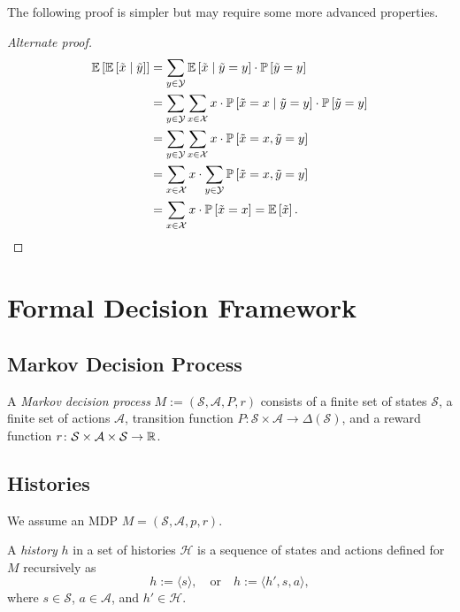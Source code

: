 The following proof is simpler but may require some more advanced properties.
\begin{proof}[Alternate proof]
\begin{align*}
\mathbb{E}\left[\mathbb{E}\left[\tilde{x} \mid  \tilde{y}\right] \right]
&= \sum_{y\in \mathcal{Y}} \mathbb{E}\left[\tilde{x} \mid \tilde{y} = y \right] \cdot \mathbb{P}\left[ \tilde{y} = y \right]  \\
&= \sum_{y\in \mathcal{Y}} \sum_{x\in \mathcal{X}} x \cdot \mathbb{P}\left[\tilde{x} = x \mid \tilde{y} = y \right] \cdot \mathbb{P}\left[ \tilde{y} = y \right]  \\
&= \sum_{y\in \mathcal{Y}} \sum_{x\in \mathcal{X}} x \cdot  \mathbb{P}\left[\tilde{x} = x, \tilde{y} = y \right]   \\
&=  \sum_{x\in \mathcal{X}} x \cdot \sum_{y\in \mathcal{Y}} \mathbb{P}\left[\tilde{x} = x, \tilde{y} = y \right]   \\
&=  \sum_{x\in \mathcal{X}} x \cdot  \mathbb{P}\left[\tilde{x} = x \right]  = \mathbb{E} \left[ \tilde{x} \right].
\end{align*}
\end{proof}

\section{Formal Decision Framework}

\subsection{Markov Decision Process}

\begin{definition} \label{def:MDP}
A \emph{Markov decision process} $M := (\mathcal{S}, \mathcal{A}, P, r)$ consists of a finite set of states $\mathcal{S}$, a finite set of actions $\mathcal{A}$, transition function $P\colon \mathcal{S} \times \mathcal{A} \to  \Delta(\mathcal{S})$, and a reward function $r \colon \mathcal{S} \times \mathcal{A} \times \mathcal{S} \to \mathbb{R}$.
 \leanok
\end{definition}

\subsection{Histories}

We assume an MDP $M = (\mathcal{S}, \mathcal{A}, p, r)$.

\begin{definition} \label{def:Hist}
A \emph{history} $h$ in a set of histories $\mathcal{H}$ is a sequence of states and actions defined for $M$ recursively as
\[
  h := \langle s \rangle, \quad
  \text{or} \quad
  h := \langle h', s, a \rangle,
\]
where $s \in \mathcal{S}$, $a\in \mathcal{A}$, and $h'\in \mathcal{H}$.
 \leanok
\end{definition}

